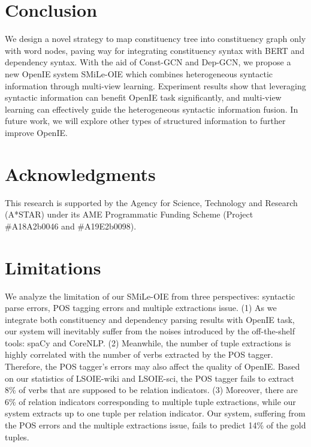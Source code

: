 \documentclass[11pt]{article}
\newcommand{\mname}{SMiLe-OIE\xspace}
\begin{document}
\section{Conclusion}
We design a novel strategy to map constituency tree into constituency graph only with word nodes, paving way for integrating constituency syntax with BERT and dependency syntax.
With the aid of Const-GCN and Dep-GCN, we propose a new OpenIE system \mname which combines heterogeneous syntactic information through multi-view learning. Experiment results show that leveraging syntactic information can benefit OpenIE task significantly, and multi-view learning can effectively guide the heterogeneous syntactic information fusion. In future work, we will explore other types of structured information to further improve OpenIE.

\section*{Acknowledgments}
This research is supported by the Agency for Science, Technology and Research (A*STAR) under its AME Programmatic Funding Scheme (Project \#A18A2b0046 and \#A19E2b0098).


\clearpage
\section*{Limitations}


We analyze the limitation of our \mname from three perspectives: syntactic parse errors, POS tagging errors and multiple extractions issue.
(1) As we integrate both constituency and dependency parsing results with OpenIE task, our system will inevitably suffer from the noises introduced by the off-the-shelf tools: spaCy and CoreNLP.
(2) Meanwhile, the number of tuple extractions is highly correlated with the number of verbs extracted by the POS tagger.
Therefore, the POS tagger's errors may also affect the quality of OpenIE. Based on our statistics of LSOIE-wiki and LSOIE-sci, the POS tagger fails to extract 8\% of verbs that are supposed to be relation indicators. 
(3) Moreover, there are 6\% of relation indicators corresponding to multiple tuple extractions, while our system extracts up to one tuple per relation indicator. 
Our system, suffering from the POS errors and the multiple extractions issue, fails to predict 14\% of the gold tuples.







\end{document}
